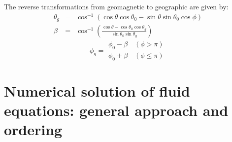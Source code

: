 \documentclass[11pt,letterpaper]{article}
\begin{document}
The reverse transformations from geomagnetic to geographic are given by:  
\begin{eqnarray}
\theta_g &=& \cos^{-1} \left( \cos \theta \cos \theta_0 - \sin \theta \sin \theta_0 \cos \phi \right) \\
\beta &=& \cos^{-1} \left( \frac{\cos \theta - \cos \theta_0 \cos \theta_g}{\sin \theta_0 \sin \theta_g} \right)
\end{eqnarray}
\begin{equation}
\phi_g= 
\begin{array}{c}
\phi_0 - \beta \quad (\phi > \pi) \\
\phi_0 + \beta \quad (\phi \le \pi)
\end{array}
\end{equation}



\section{Numerical solution of fluid equations:  general approach and ordering}
\end{document}
